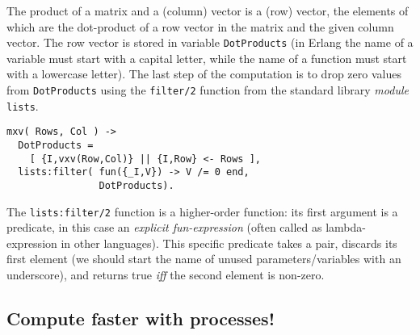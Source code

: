 The product of a matrix and a (column) vector is a (row) vector, the
elements of which are the dot-product of a row vector in the matrix and
the given column vector. The row vector is stored in variable
\lstinline[language=myerlang]{DotProducts} (in Erlang the name of a variable must start with a capital
letter, while the name of a function must start with a lowercase letter).
The last step of the computation is to drop zero values from \lstinline[language=myerlang]{DotProducts}
using the \lstinline[language=myerlang]{filter/2} function from the
standard library \emph{module} \lstinline[language=myerlang]{lists}.

\begin{lstlisting}[language=myerlang]
mxv( Rows, Col ) ->
  DotProducts =
    [ {I,vxv(Row,Col)} || {I,Row} <- Rows ],
  lists:filter( fun({_I,V}) -> V /= 0 end,
                DotProducts).
\end{lstlisting}

The \lstinline[language=myerlang]{lists:filter/2} function is a higher-order function: its first
argument is a predicate, in this case an \emph{explicit fun-expression}
(often called as lambda-expression in other languages). This specific predicate
takes a pair, discards its first element (we should start the name of
unused parameters/variables with an underscore), and returns true 
\emph{iff} the second element is non-zero.



\subsection{Compute faster with
processes!}\label{compute-faster-with-processes}

